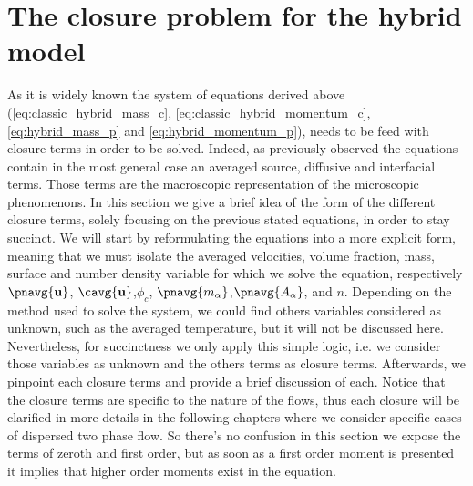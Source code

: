 \section{The closure problem for the hybrid model}

As it is widely known the system of equations derived above (\ref{eq:classic_hybrid_mass_c}, \ref{eq:classic_hybrid_momentum_c}, \ref{eq:hybrid_mass_p} and \ref{eq:hybrid_momentum_p}), needs to be feed with closure terms in order to be solved. 
Indeed, as previously observed the equations contain in the most general case an averaged source, diffusive and interfacial terms. 
Those terms are the macroscopic representation of the microscopic phenomenons.
In this section we give a brief idea of the form of the different closure terms, solely focusing on the previous stated equations, in order to stay succinct.
We will start by reformulating the equations into a more explicit form, meaning that we must isolate the averaged velocities, volume fraction, mass, surface and number density variable for which we solve the equation, respectively $\pnavg{\textbf{u}}$, $\cavg{\textbf{u}}$,$\phi_c$, $\pnavg{m_\alpha}$,$\pnavg{A_\alpha}$, and $n$. 
Depending on the method used to solve the system, we could find others variables considered as unknown, such as the averaged temperature, but it will not be discussed here.
Nevertheless, for succinctness we only apply this simple logic, i.e. we consider those variables as unknown and the others terms as closure terms. 
Afterwards, we pinpoint each closure terms and provide a brief discussion of each. 
Notice that the closure terms are specific to the nature of the flows, thus each closure will be clarified in more details in the following chapters where we consider specific cases of dispersed two phase flow. 
So there's no confusion in this section we expose the terms of zeroth and first order, but as soon as a first order moment is presented it implies that higher order moments exist in the equation.

